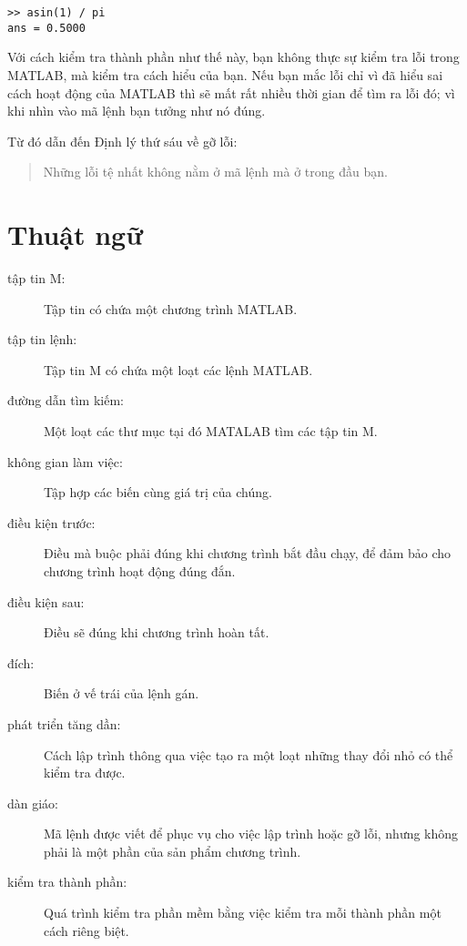 \documentclass[12pt]{book}
\begin{document}
\begin{verbatim}
>> asin(1) / pi
ans = 0.5000
\end{verbatim}
%
Với cách kiểm tra thành phần như thế này, bạn không thực sự kiểm tra
lỗi trong MATLAB, mà kiểm tra cách hiểu của bạn. Nếu bạn mắc lỗi
chỉ vì đã hiểu sai cách hoạt động của MATLAB thì sẽ mất rất nhiều
thời gian để tìm ra lỗi đó; vì khi nhìn vào mã lệnh bạn tưởng như
nó đúng.

Từ đó dẫn đến Định lý thứ sáu về gỡ lỗi:

\begin{quote}
Những lỗi tệ nhất không nằm ở mã lệnh mà ở trong đầu bạn.
\end{quote}



\section{Thuật ngữ}

\begin{description}

\item[tập tin M:] Tập tin có chứa một chương trình MATLAB.

\item[tập tin lệnh:] Tập tin M có chứa một loạt các lệnh MATLAB.

\item[đường dẫn tìm kiếm:] Một loạt các thư mục tại đó MATALAB tìm các
tập tin M.

\item[không gian làm việc:] Tập hợp các biến cùng giá trị của chúng.

\item[điều kiện trước:] Điều mà buộc phải đúng khi chương trình bắt đầu
chạy, để đảm bảo cho chương trình hoạt động đúng đắn.

\item[điều kiện sau:] Điều sẽ đúng khi chương trình hoàn tất.

\item[đích:] Biến ở vế trái của lệnh gán.

\item[phát triển tăng dần:] Cách lập trình thông qua việc tạo ra một
loạt những thay đổi nhỏ có thể kiểm tra được.

\item[dàn giáo:] Mã lệnh được viết để phục vụ cho việc lập trình hoặc
gỡ lỗi, nhưng không phải là một phần của sản phẩm chương trình.

\item[kiểm tra thành phần:] Quá trình kiểm tra phần mềm bằng việc
kiểm tra mỗi thành phần một cách riêng biệt.

\end{description}
\end{document}
